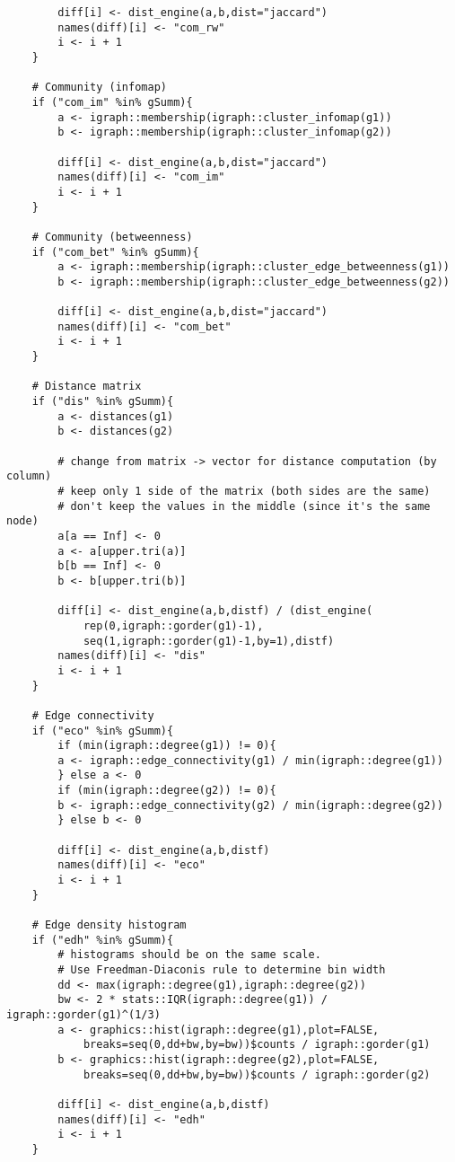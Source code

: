 {\begin{lstlisting}
		diff[i] <- dist_engine(a,b,dist="jaccard")
		names(diff)[i] <- "com_rw"
		i <- i + 1
	}
	
	# Community (infomap)
	if ("com_im" %in% gSumm){
		a <- igraph::membership(igraph::cluster_infomap(g1))
		b <- igraph::membership(igraph::cluster_infomap(g2))
		
		diff[i] <- dist_engine(a,b,dist="jaccard")
		names(diff)[i] <- "com_im"
		i <- i + 1
	}
	
	# Community (betweenness)
	if ("com_bet" %in% gSumm){
		a <- igraph::membership(igraph::cluster_edge_betweenness(g1))
		b <- igraph::membership(igraph::cluster_edge_betweenness(g2))
		
		diff[i] <- dist_engine(a,b,dist="jaccard")
		names(diff)[i] <- "com_bet"
		i <- i + 1
	}
	
	# Distance matrix 
	if ("dis" %in% gSumm){
	    a <- distances(g1)
	    b <- distances(g2)
	    
	    # change from matrix -> vector for distance computation (by column)
	    # keep only 1 side of the matrix (both sides are the same)
	    # don't keep the values in the middle (since it's the same node)
	    a[a == Inf] <- 0
	    a <- a[upper.tri(a)]
	    b[b == Inf] <- 0
	    b <- b[upper.tri(b)]
	    
	    diff[i] <- dist_engine(a,b,distf) / (dist_engine(
		    rep(0,igraph::gorder(g1)-1),
		    seq(1,igraph::gorder(g1)-1,by=1),distf)
	    names(diff)[i] <- "dis"
	    i <- i + 1
	}
	
	# Edge connectivity 
	if ("eco" %in% gSumm){
		if (min(igraph::degree(g1)) != 0){
		a <- igraph::edge_connectivity(g1) / min(igraph::degree(g1))
		} else a <- 0
		if (min(igraph::degree(g2)) != 0){
		b <- igraph::edge_connectivity(g2) / min(igraph::degree(g2))
		} else b <- 0
		
		diff[i] <- dist_engine(a,b,distf)
		names(diff)[i] <- "eco"
		i <- i + 1
	}
	
	# Edge density histogram
	if ("edh" %in% gSumm){
		# histograms should be on the same scale. 
		# Use Freedman-Diaconis rule to determine bin width
		dd <- max(igraph::degree(g1),igraph::degree(g2))
		bw <- 2 * stats::IQR(igraph::degree(g1)) / igraph::gorder(g1)^(1/3)
		a <- graphics::hist(igraph::degree(g1),plot=FALSE,
			breaks=seq(0,dd+bw,by=bw))$counts / igraph::gorder(g1)
		b <- graphics::hist(igraph::degree(g2),plot=FALSE,
			breaks=seq(0,dd+bw,by=bw))$counts / igraph::gorder(g2)
		
		diff[i] <- dist_engine(a,b,distf)
		names(diff)[i] <- "edh"
		i <- i + 1
	}
	

\end{lstlisting}}
